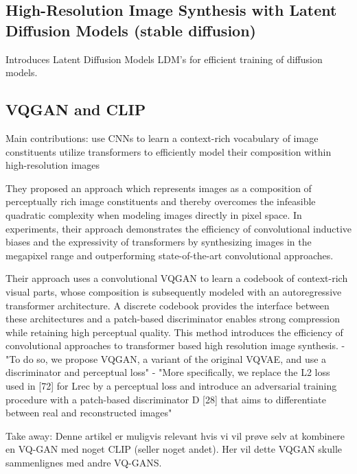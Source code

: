 \subsection{High-Resolution Image Synthesis with Latent Diffusion Models (stable diffusion)}
Introduces Latent Diffusion Models LDM's for efficient training of diffusion models.


\cite{stablediffusion}

\subsection{VQGAN and CLIP}

Main contributions:
     use CNNs to learn a context-rich vocabulary of image constituents
      utilize transformers to efficiently model their composition within high-resolution images

They proposed an approach which represents images as a composition of perceptually rich image constituents and thereby overcomes the infeasible quadratic complexity when modeling images directly in pixel space. 
In experiments, their approach demonstrates the efficiency of convolutional inductive biases and the expressivity of transformers by synthesizing images in the megapixel range and outperforming state-of-the-art convolutional approaches.

Their approach uses a convolutional VQGAN to learn a codebook of context-rich visual parts, whose composition is subsequently modeled with an autoregressive transformer architecture. A discrete codebook provides the interface between these architectures and a patch-based discriminator enables strong compression while retaining high perceptual quality. This method introduces the efficiency of convolutional approaches to transformer based high resolution image synthesis.
    - "To do so, we propose VQGAN, a variant of the original VQVAE, and use a discriminator and perceptual loss"
    - "More specifically, we replace the L2 loss used in [72] for Lrec by a perceptual loss and introduce an adversarial training procedure with a patch-based discriminator D [28] that aims to differentiate between real and reconstructed images" 


Take away:
Denne artikel er muligvis relevant hvis vi vil prøve selv at kombinere en VQ-GAN med noget CLIP (seller noget andet). Her vil dette VQGAN skulle sammenlignes med andre VQ-GANS.
\cite{}